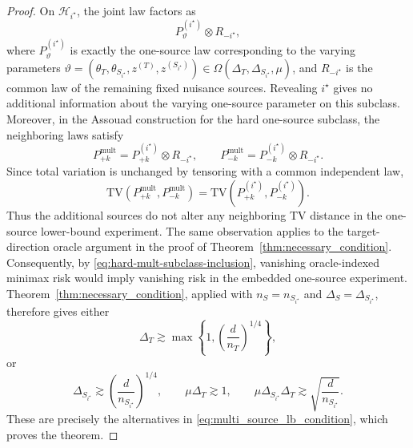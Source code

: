 \documentclass[10pt]{article}
\newcommand{\TV}{\mathrm{TV}}
\newcommand{\trg}{T}
\newcommand{\thetaT}{\theta_{\trg}}
\newcommand{\nT}{n_{\trg}}
\newcommand{\ztar}{z^{(\trg)}}
\newcommand{\DeltaT}{\Delta_{\trg}}
\newcommand{\src}{S}
\newcommand{\nS}{n_{\src}}
\newcommand{\nSm}[1]{n_{\src_{#1}}}
\newcommand{\zsrcm}[1]{z^{(\src_{#1})}}
\newcommand{\thetamS}[1]{\theta_{\src_{#1}}}
\newcommand{\DeltaS}{\Delta_{\src}}
\newcommand{\DeltaSm}[1]{\Delta_{\src_{#1}}}
\begin{document}
\begin{proof}
On $\mathcal H_{i^\star}$, the joint law factors as
\[
    P_{\vartheta}^{(i^\star)}\otimes R_{-i^\star},
\]
where $P_{\vartheta}^{(i^\star)}$ is exactly the one-source law corresponding
to the varying parameters
$\vartheta=(\thetaT,\thetamS{i^\star},\ztar,\zsrcm{i^\star})\in
\Omega(\DeltaT,\DeltaSm{i^\star},\mu)$, and $R_{-i^\star}$ is the common law
of the remaining fixed nuisance sources.  Revealing $i^\star$ gives no
additional information about the varying one-source parameter on this
subclass.  Moreover, in the Assouad construction for the hard one-source
subclass, the neighboring laws satisfy
\[
    P_{+k}^{\mathrm{mult}} = P_{+k}^{(i^\star)}\otimes R_{-i^\star},
    \qquad
    P_{-k}^{\mathrm{mult}} = P_{-k}^{(i^\star)}\otimes R_{-i^\star}.
\]
Since total variation is unchanged by tensoring with a common independent law,
\[
    \TV(P_{+k}^{\mathrm{mult}},P_{-k}^{\mathrm{mult}})
    =
    \TV(P_{+k}^{(i^\star)},P_{-k}^{(i^\star)}).
\]
Thus the additional sources do not alter any neighboring TV distance in the
one-source lower-bound experiment.  The same observation applies to the
target-direction oracle argument in the proof of
Theorem~\ref{thm:necessary_condition}.  Consequently, by
\eqref{eq:hard-mult-subclass-inclusion}, vanishing oracle-indexed minimax risk
would imply vanishing risk in the embedded one-source experiment.
Theorem~\ref{thm:necessary_condition}, applied with
$\nS=\nSm{i^\star}$ and $\DeltaS=\DeltaSm{i^\star}$, therefore gives either
\[
    \DeltaT\gtrsim
    \max\!\left\{1,\left(\frac d{\nT}\right)^{1/4}\right\},
\]
or
\[
    \DeltaSm{i^\star}\gtrsim
    \left(\frac d{\nSm{i^\star}}\right)^{1/4},
    \qquad
    \mu\DeltaT\gtrsim1,
    \qquad
    \mu\DeltaSm{i^\star}\DeltaT
    \gtrsim\sqrt{\frac d{\nSm{i^\star}}}.
\]
These are precisely the alternatives in
\eqref{eq:multi_source_lb_condition}, which proves the theorem.
\end{proof}
\end{document}
